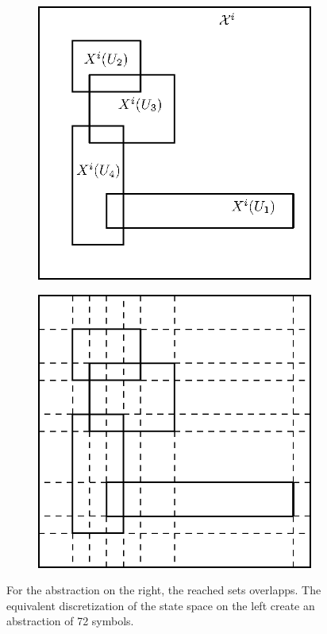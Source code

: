 \begin{figure}
\centering
\begin{subfigure}[b]{0.49\textwidth}
	\includegraphics[width=\textwidth]{chapters/abstraction_reduction/overlapp_disc.eps}
\end{subfigure}	
\begin{subfigure}[b]{0.49\textwidth}
	\includegraphics[width=\textwidth]{chapters/abstraction_reduction/overlapp_disc2.eps}
\end{subfigure}	
\caption{For the abstraction on the right, the reached sets overlapps. The equivalent discretization of the state space on the left create an abstraction of 72 symbols.}
\end{figure}

